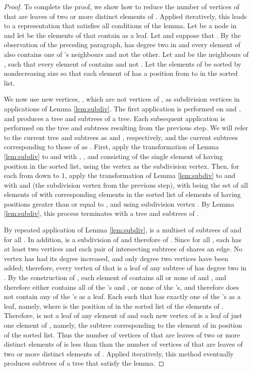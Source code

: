 \documentclass[
final
]{dmtcs-episciences}        \usepackage{graphics, amsthm, amsmath, amssymb, algorithm, algorithmic}
\begin{document}
\begin{proof}
To complete the proof, we show how to 
reduce the number of vertices of  that are leaves of two or more distinct elements of . Applied iteratively, this leads to a representation that satisfies all conditions of the lemma.
Let  be a node in 
and let  be the elements of  that contain  as a leaf.
Let  and suppose that .
By the observation of the preceding paragraph,  has degree two in 
and every element of  also contains one of 's neighbours and not the other.
Let  and  be the neighbours of , such that every element of  contains  and not .
Let the elements of  be
sorted by nondecreasing size so that each element of  has a position from  to  in the sorted list.

We now use  new vertices, , which are not vertices of , as subdivision vertices in  applications of Lemma \ref{lem:subdiv}.
The first application is performed on  and , and produces a tree and subtrees of a tree. Each subsequent application is performed on the tree and subtrees resulting from the previous step. We will refer to the current tree and subtrees as  and , respectively, and the current subtrees corresponding to those of  as .
First, apply the transformation of Lemma \ref{lem:subdiv} to  and  with , , and  consisting of the single element of  having position  in the sorted list, using the vertex  as the subdivision vertex.
Then, for each  from  down to 1, apply the transformation of Lemma \ref{lem:subdiv} to  and  with  and  (the subdivision vertex from the previous step), with  being the set of all elements of  with corresponding elements in the sorted list of elements of  having positions greater than or equal to , and using subdivision vertex .
By Lemma \ref{lem:subdiv}, this process terminates with a tree  and subtrees  of .

By repeated application of Lemma \ref{lem:subdiv},
 is a multiset of subtrees of  and
 for all .
In addition,   is a subdivision of  and therefore of . Since  for all , each  has at least two vertices and each pair of intersecting subtrees of  shares an edge. No vertex has had its degree increased, and only degree two vertices have been added; therefore, every vertex of  that is a leaf of any subtree of  has degree two in . 
By the construction of , each element  of  contains all or none of  and , and therefore
 either contains all of the 's and , or none of the 's, and therefore does not contain any of the 's as a leaf.
Each  such that 
has exactly one of the 's as a leaf, namely,  where  is the position of  in the sorted list of the elements of . 
Therefore,  is not a leaf of any element of  and each new vertex  of  is a leaf of just one element of , namely, the subtree corresponding to the element of  in position  of the sorted list. 
Thus the number of vertices of  that are leaves of two or more distinct elements of  is less than than the number of vertices of  that are leaves of two or more distinct elements of . 
Applied iteratively, this method eventually produces subtrees  of a tree  that satisfy the lemma.
\end{proof}
\end{document}
